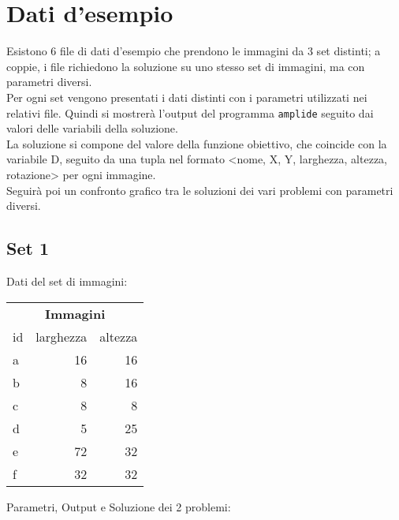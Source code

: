 
\section{Dati d'esempio}

	Esistono 6 file di dati d'esempio che prendono le immagini da 3 set distinti; a coppie, i file richiedono la soluzione su uno stesso set di immagini, ma con parametri diversi. \\
	Per ogni set vengono presentati i dati distinti con i parametri utilizzati nei relativi file. Quindi si mostrerà l'output del programma \texttt{amplide} seguito dai valori delle variabili della soluzione. \\
	La soluzione si compone del valore della funzione obiettivo, che coincide con la variabile D, seguito da una tupla nel formato <nome, X, Y, larghezza, altezza, rotazione> per ogni immagine. \\
	Seguirà poi un confronto grafico tra le soluzioni dei vari problemi con parametri diversi.



	\subsection{Set 1}
Dati del set di immagini:  \\

\begin{table}[H]
\centering
\footnotesize
\begin{tabular}{l|r|r}
\multicolumn{3}{c}{\textbf{Immagini}} \\ 
id & larghezza & altezza \\
\hline
a & 16 & 16 \\
b & 8&16\\
c & 8& 8\\
d & 5&25\\
e & 72&32\\
f & 32 &32\\
\end{tabular}
\end{table}


\noindent Parametri, Output e Soluzione dei 2 problemi: 

